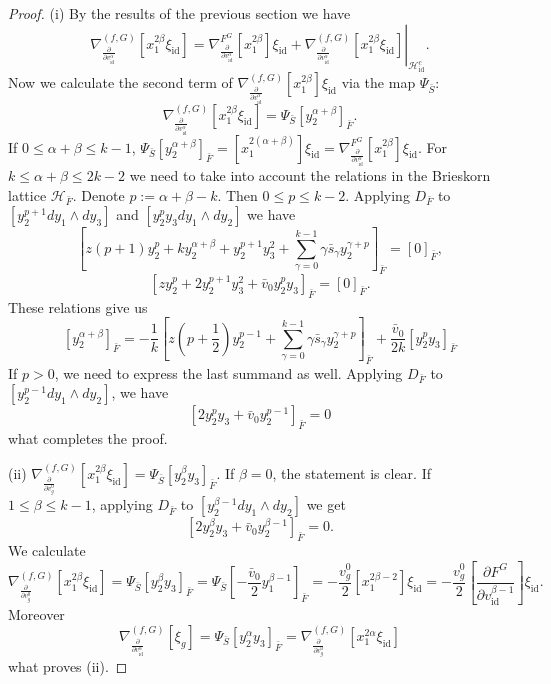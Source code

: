 \documentclass[reqno,12pt]{amsart}
\numberwithin{equation}{section}
\theoremstyle{plain}
\theoremstyle{definition}
\newcommand{\id}{\mathrm{id}}
\def\H{{\mathcal H}}
\numberwithin{equation}{section}
\begin{document}
\begin{proof}

 (i) By the results of the previous section we have
\[
 \nabla_{\frac{\partial}{\partial v^\alpha_{\id}}}^{(f,G)}[x_1^{2\beta}\xi_{\id}] = \nabla^{F^G}_{\frac{\partial}{\partial v^\alpha_{\id}}}[x_1^{2\beta}]\xi_{\id} + \left.\nabla_{\frac{\partial}{\partial v^\alpha_{\id}}}^{(f,G)}[x_1^{2\beta}\xi_{\id}]\right\vert_{\H_{\id}^c}.
\]
Now we calculate the second term of $\nabla_{\frac{\partial}{\partial v^\alpha_{\id}}}^{(f,G)}[x_1^{2\beta}]\xi_{\id}$ via the map $\Psi_{\bar{S}}$:
\[
\nabla_{\frac{\partial}{\partial v^\alpha_{\id}}}^{(f,G)}[x_1^{2\beta}\xi_{\id}] = \Psi_{\bar{S}}[y_2^{\alpha+\beta}]_{\bar{F}}.
\]
If $ 0 \le \alpha+\beta \le k-1$, $\Psi_{\bar{S}} [y_2^{\alpha+\beta}]_{\bar{F}} = [x_1^{2(\alpha+\beta)}]\xi_{\id} = \nabla^{F^G}_{\frac{\partial}{\partial v^\alpha_\id}}[x_1^{2\beta}]\xi_{\id}$. For $k \le \alpha+\beta \le 2k-2$ we need to take into account the relations in the Brieskorn lattice $\H_{\bar F}$. Denote $p := \alpha+\beta - k$. Then $0 \le p \le k-2$. Applying $D_{\bar{F}}$ to $[y_2^{p+1}dy_1\wedge dy_3]$ and $[y_2^{p}y_3dy_1\wedge dy_2]$ we have
 \[
 [z (p+1)y_2^{p} + ky_2^{\alpha +\beta} + y_2^{p+1}y_3^2 +\sum_{\gamma = 0}^{k-1}\gamma\bar{s}_\gamma y_2^{\gamma + p }]_{\bar{F}} = [0]_{\bar{F}},
 \]
 \[
 [z y_2^{p} + 2y_2^{p+1}y_3^2 + \bar{v}_{0}y_2^{p}y_3]_{\bar{F}} = [0] _{\bar{F}}.
 \]
These relations give us
 \[
 [y_2^{\alpha+\beta}]_{\bar{F}} = -\frac{1}{k}[z(p + \frac{1}{2}) y_2^{p-1}+\sum_{\gamma = 0}^{k-1}\gamma\bar{s}_\gamma y_2^{\gamma +p}]_{\bar{F}} + \frac{\bar{v}_{0}}{2k}[y_2^{p}y_3]_{\bar{F}}
 \]
 If $p > 0$, we need to express the last summand as well. Applying $D_{\bar F}$ to $[y_2^{p-1} dy_1 \wedge dy_2]$, we have
 \[
    [2 y_2^py_3 + \bar v_0 y_2^{p-1}]_{\bar F} = 0
 \]
 what completes the proof.


(ii) $\nabla_{\frac{\partial}{\partial v^0_{g}}}^{(f,G)}[x_1^{2\beta}\xi_{\id}] = \Psi_{\bar{S}}[y_2^{\beta}y_3]_{\bar{F}}$. If $\beta = 0$, the statement is clear. If $1\le \beta \le k-1$, applying $D_{\bar{F}}$ to $[y_2^{\beta-1}dy_1\wedge dy_2]$ we get
\[
[2y_2^\beta y_3 + \bar{v}_0y_2^{\beta-1}]_{\bar{F}} = 0.
\]
We calculate
\[
\nabla_{\frac{\partial}{\partial v^0_{g}}}^{(f,G)}[x_1^{2\beta}\xi_{\id}] = \Psi_{\bar{S}}[y_2^{\beta}y_3]_{\bar{F}} 
= \Psi_{\bar{S}}[-\frac{\bar{v}_0}{2}y_1^{\beta-1}]_{\bar{F}} 
= - \frac{v_g^0}{2}[x_1^{2\beta-2}]\xi_{\id} 
=  - \frac{v_g^0}{2}\left[\frac{\partial F^G}{\partial v^{\beta-1}_{\id}}\right]\xi_{\id}.
\]
Moreover
\[ 
\nabla_{\frac{\partial}{\partial v^\alpha_{\id}}}^{(f,G)}[\xi_g] = \Psi_{\bar{S}}[y_2^{\alpha}y_3]_{\bar{F}} = 
\nabla_{\frac{\partial}{\partial v^0_g}}^{(f,G)}[x_1^{2\alpha}\xi_{\id}]
\]
what proves (ii).


\end{proof}
\end{document}
